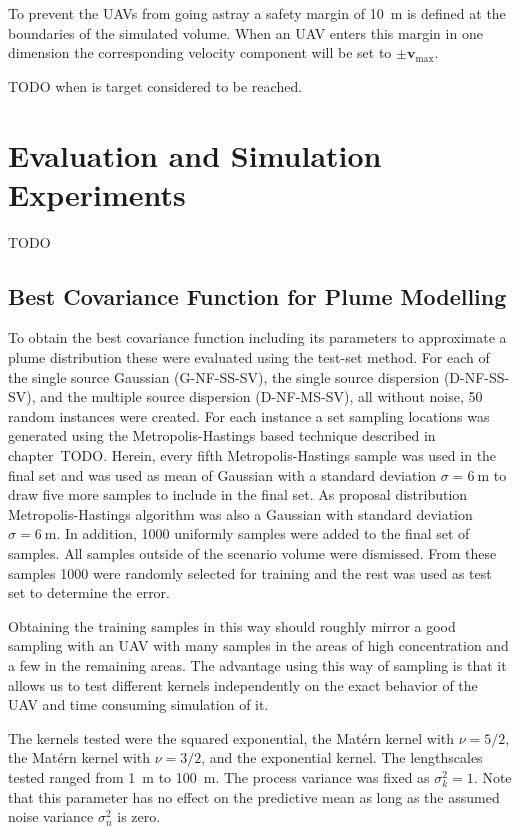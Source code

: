 \documentclass[11pt,a4paper,twoside,BCOR=15mm]{scrreprt}
\newcommand{\vc}[1]{\bm{#1}}
\begin{document}
To prevent the UAVs from going astray a safety margin of \SI{10}{\meter} is 
defined at the boundaries of the simulated volume. When an UAV enters this 
margin in one dimension the corresponding velocity component will be set to $\pm 
\vc v_{\max}$.

TODO when is target considered to be reached.

\chapter{Evaluation and Simulation Experiments}
TODO

\section{Best Covariance Function for Plume Modelling}
To obtain the best covariance function including its parameters to approximate 
a plume distribution these were evaluated using the test-set method. For each of 
the single source Gaussian (G-NF-SS-SV), the single source dispersion 
(D-NF-SS-SV), and the multiple source dispersion (D-NF-MS-SV), all without 
noise, 50 random instances were created. For each instance a set sampling 
locations was generated using the Metropolis-Hastings based technique described 
in chapter~TODO\@. Herein, every fifth Metropolis-Hastings sample was used in 
the final set and was used as mean of Gaussian with a standard deviation $\sigma 
= \SI{6}{\meter}$ to draw five more samples to include in the final set. As 
proposal distribution Metropolis-Hastings algorithm was also a Gaussian with 
standard deviation $\sigma = \SI{6}{\meter}$. In addition, 1000 uniformly 
samples were added to the final set of samples. All samples outside of the 
scenario volume were dismissed. From these samples 1000 were randomly selected 
for training and the rest was used as test set to determine the error.

Obtaining the training samples in this way should roughly mirror a good sampling 
with an UAV with many samples in the areas of high concentration and a few in 
the remaining areas. The advantage using this way of sampling is that it allows 
us to test different kernels independently on the exact behavior of the UAV and 
time consuming simulation of it.

The kernels tested were the squared exponential, the Mat\'ern kernel with $\nu 
= 5/2$, the Mat\'ern kernel with $\nu = 3/2$, and the exponential kernel. The 
lengthscales tested ranged from \SI{1}{\meter} to \SI{100}{\meter}. The process 
variance was fixed as $\sigma_k^2 = 1$. Note that this parameter has no effect 
on the predictive mean as long as the assumed noise variance $\sigma_n^2$ is 
zero.
\end{document}

